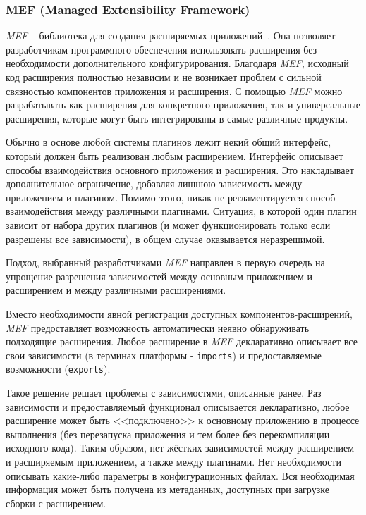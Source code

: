 \subsubsection{MEF (Managed Extensibility Framework)}

{\it MEF} -- библиотека для создания расширяемых приложений~\cite{mef-website}. Она позволяет разработчикам программного обеспечения использовать расширения без необходимости дополнительного конфигурирования. Благодаря {\it MEF}, исходный код расширения полностью независим и не возникает проблем с сильной связностью компонентов приложения и расширения. С помощью {\it MEF} можно разрабатывать как расширения для конкретного приложения, так и универсальные расширения, которые могут быть интегрированы в самые различные продукты.

Обычно в основе любой системы плагинов лежит некий общий интерфейс, который должен быть реализован любым расширением. Интерфейс описывает способы взаимодействия основного приложения и расширения. Это накладывает дополнительное ограничение, добавляя лишнюю зависимость между приложением и плагином. Помимо этого, никак не регламентируется способ взаимодействия между различными плагинами. Ситуация, в которой один плагин зависит от набора других плагинов (и может функционировать только если разрешены все зависимости), в общем случае оказывается неразрешимой.

Подход, выбранный разработчиками {\it MEF} направлен в первую очередь на упрощение разрешения зависимостей между основным приложением и расширением и между различными расширениями.

Вместо необходимости явной регистрации доступных компонентов-расширений, {\it MEF} предоставляет возможность автоматически неявно обнаруживать подходящие расширения. Любое расширение в {\it MEF} декларативно описывает все свои зависимости (в терминах платформы - {\tt imports}) и предоставляемые возможности ({\tt exports}).

Такое решение решает проблемы с зависимостями, описанные ранее. Раз зависимости и предоставляемый функционал описывается декларативно, любое расширение может быть <<подключено>> к основному приложению в процессе выполнения (без перезапуска приложения и тем более без перекомпиляции исходного кода). Таким образом, нет жёстких зависимостей между расширением и расширяемым приложением, а также между плагинами. Нет необходимости описывать какие-либо параметры в конфигурационных файлах. Вся необходимая информация может быть получена из метаданных, доступных при загрузке сборки с расширением.

